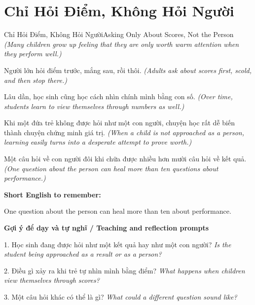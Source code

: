 \section{Chỉ Hỏi Điểm, Không Hỏi Người}
\begin{truyen}{Chỉ Hỏi Điểm, Không Hỏi Người}{Asking Only About Scores, Not the Person}
\textit{(Many children grow up feeling that they are only worth warm attention when they perform well.)}

Người lớn hỏi điểm trước, mắng sau, rồi thôi.
\textit{(Adults ask about scores first, scold, and then stop there.)}

Lâu dần, học sinh cũng học cách nhìn chính mình bằng con số.
\textit{(Over time, students learn to view themselves through numbers as well.)}

Khi một đứa trẻ không được hỏi như một con người, chuyện học rất dễ biến thành chuyện chứng minh giá trị.
\textit{(When a child is not approached as a person, learning easily turns into a desperate attempt to prove worth.)}

\end{truyen}

\begin{baihoc}
Một câu hỏi về con người đôi khi chữa được nhiều hơn mười câu hỏi về kết quả.
\textit{(One question about the person can heal more than ten questions about performance.)}
\end{baihoc}

\begin{ghinhoanh}
\textbf{Short English to remember:}

One question about the person can heal more than ten about performance.

\end{ghinhoanh}

\begin{tuhocnhanh}
\textbf{Gợi ý để dạy và tự nghĩ / Teaching and reflection prompts}

1. Học sinh đang được hỏi như một kết quả hay như một con người? \textit{Is the student being approached as a result or as a person?}

2. Điều gì xảy ra khi trẻ tự nhìn mình bằng điểm? \textit{What happens when children view themselves through scores?}

3. Một câu hỏi khác có thể là gì? \textit{What could a different question sound like?}
\end{tuhocnhanh}
\ngancach

